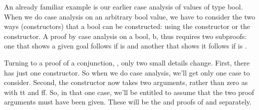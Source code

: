 \documentclass[letterpaper,10pt,english]{sphinxmanual}
\begin{document}
\sphinxAtStartPar
An already familiar example is our earlier case analysis of values
of type bool. When we do case analysis on an arbitrary bool value,
we have to consider the two ways (constructors) that a bool can be
constructed: using the  constructor or the  constructor. A
proof by case analysis on a bool, b, thus requires two sub\sphinxhyphen{}proofs:
one that shows a given goal follows if  is  and another that
shows it follows if  is .

\begin{sphinxVerbatim}[commandchars=\\\{\}]
           
               
     
\end{sphinxVerbatim}

\sphinxAtStartPar
Turning to a proof of a conjunction, , only two
small details change. First, there  has just one
constructor. So when we do case analysis, we’ll get only
one case to consider. Second, the constructor now takes
two arguments, rather than zero as with tt and ff. So,
in that one case, we’ll be entitled to assume that the
two proof arguments must have been given. These will be
the  and  proofs of  and  separately.

\begin{sphinxVerbatim}[commandchars=\\\{\}]
          
            
       
             

         
     
\end{sphinxVerbatim}
\end{document}
